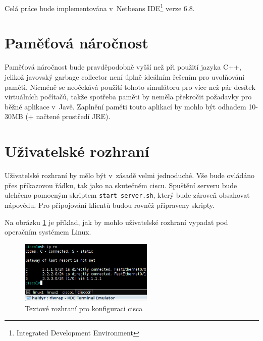 Celá práce bude implementována v~Netbeans IDE\footnote{Integrated Development Environment} verze 6.8.


\section{Paměťová náročnost}
Paměťová náročnost bude pravděpodobně vyšší než při použití jazyka C++, jelikož javovský garbage collector není úplně ideálním řešením pro uvolňování paměti. Nicméně se neočekává použití tohoto simulátoru pro více než pár desítek virtuálních počítačů, takže spotřeba paměti by neměla překročit požadavky pro běžné aplikace v~Javě. Zaplnění paměti touto aplikací by mohlo být odhadem 10-30MB (+ načtené prostředí JRE).


\section{Uživatelské rozhraní}
Uživatelské rozhraní by mělo být v~zásadě velmi jednoduché. Vše bude ovládáno přes příkazovou řádku, tak jako na skutečném ciscu. Spuštění serveru bude ulehčeno pomocným skriptem \verb|start_server.sh|, který bude zároveň obsahovat nápovědu. Pro připojování klientů budou rovněž připraveny skripty. 

Na obrázku \ref{fig:uziv_rozh} je příklad, jak by mohlo uživatelské rozhraní vypadat pod operačním systémem Linux.

\begin{figure}[h]
\begin{center}
\includegraphics[height=3cm]{figures/uziv_rozhrani}
\caption{Textové rozhraní pro konfiguraci cisca}
\label{fig:uziv_rozh}
\end{center}
\end{figure}










